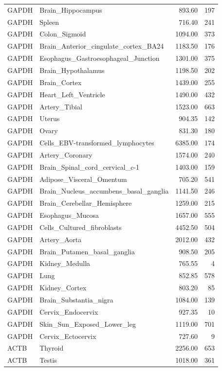 \begin{footnotesize}
\begin{longtable}{llrr}
GAPDH & Brain\_Hippocampus & 893.60 & 197 \\
GAPDH & Spleen & 716.40 & 241 \\
GAPDH & Colon\_Sigmoid & 1094.00 & 373 \\
GAPDH & Brain\_Anterior\_cingulate\_cortex\_BA24 & 1183.50 & 176 \\
GAPDH & Esophagus\_Gastroesophageal\_Junction & 1301.00 & 375 \\
GAPDH & Brain\_Hypothalamus & 1198.50 & 202 \\
GAPDH & Brain\_Cortex & 1439.00 & 255 \\
GAPDH & Heart\_Left\_Ventricle & 1490.00 & 432 \\
GAPDH & Artery\_Tibial & 1523.00 & 663 \\
GAPDH & Uterus & 904.35 & 142 \\
GAPDH & Ovary & 831.30 & 180 \\
GAPDH & Cells\_EBV-transformed\_lymphocytes & 6385.00 & 174 \\
GAPDH & Artery\_Coronary & 1574.00 & 240 \\
GAPDH & Brain\_Spinal\_cord\_cervical\_c-1 & 1403.00 & 159 \\
GAPDH & Adipose\_Visceral\_Omentum & 705.20 & 541 \\
GAPDH & Brain\_Nucleus\_accumbens\_basal\_ganglia & 1141.50 & 246 \\
GAPDH & Brain\_Cerebellar\_Hemisphere & 1259.00 & 215 \\
GAPDH & Esophagus\_Mucosa & 1657.00 & 555 \\
GAPDH & Cells\_Cultured\_fibroblasts & 4452.50 & 504 \\
GAPDH & Artery\_Aorta & 2012.00 & 432 \\
GAPDH & Brain\_Putamen\_basal\_ganglia & 908.50 & 205 \\
GAPDH & Kidney\_Medulla & 765.55 & 4 \\
GAPDH & Lung & 852.85 & 578 \\
GAPDH & Kidney\_Cortex & 803.20 & 85 \\
GAPDH & Brain\_Substantia\_nigra & 1084.00 & 139 \\
GAPDH & Cervix\_Endocervix & 927.35 & 10 \\
GAPDH & Skin\_Sun\_Exposed\_Lower\_leg & 1119.00 & 701 \\
GAPDH & Cervix\_Ectocervix & 727.60 & 9 \\
ACTB & Thyroid & 2256.00 & 653 \\
ACTB & Testis & 1018.00 & 361 \\

\end{longtable}
\end{footnotesize}
